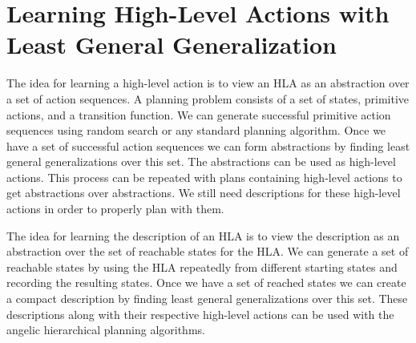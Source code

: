 \documentclass[a4paper,12pt]{article}
\begin{document}
\section{Learning High-Level Actions with Least General Generalization}
The idea for learning a high-level action is to view an HLA as an abstraction over a set of action sequences.  A planning problem consists of a set of states, primitive actions, and a transition function.  We can generate successful primitive action sequences using random search or any standard planning algorithm.  Once we have a set of successful action sequences we can form abstractions by finding least general generalizations over this set.  The abstractions can be used as high-level actions.  This process can be repeated with plans containing high-level actions to get abstractions over abstractions.  We still need descriptions for these high-level actions in order to properly plan with them. 

The idea for learning the description of an HLA is to view the description as an abstraction over the set of reachable states for the HLA.  We can generate a set of reachable states by using the HLA repeatedly from different starting states and recording the resulting states.  Once we have a set of reached states we can create a compact description by finding least general generalizations over this set.  These descriptions along with their respective high-level actions can be used with the angelic hierarchical planning algorithms.
\end{document}

